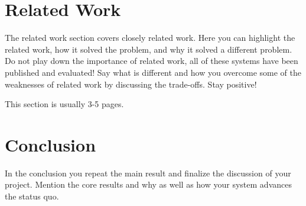 \documentclass[a4paper,11pt,oneside]{report}
\begin{document}
\chapter{Related Work}

The related work section covers closely related work. Here you can highlight
the related work, how it solved the problem, and why it solved a different
problem. Do not play down the importance of related work, all of these
systems have been published and evaluated! Say what is different and how
you overcome some of the weaknesses of related work by discussing the 
trade-offs. Stay positive!

This section is usually 3-5 pages.



\chapter{Conclusion}

In the conclusion you repeat the main result and finalize the discussion of
your project. Mention the core results and why as well as how your system
advances the status quo.

\cleardoublepage
{}
{}
\printbibliography

%
%
\end{document}
